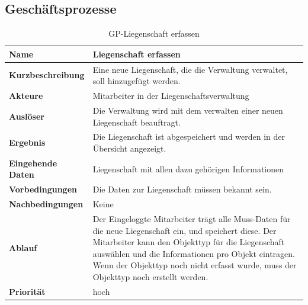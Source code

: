 \subsection{Geschäftsprozesse}
\begin{table}[H]
  \centering
  \settowidth{}
  \setlength\extrarowheight{2pt}
  \begin{tabulary}{1.0\textwidth}{|a|m{12cm}|}
    \hline
    \textbf{Name}&Liegenschaft erfassen\\
    \hline 
    \textbf{Kurzbeschreibung} & Eine neue Liegenschaft, die die Verwaltung verwaltet, soll hinzugefügt werden. \\
    \hline
    \textbf{Akteure} & Mitarbeiter in der Liegenschaftsverwaltung\\
    \hline
    \textbf{Auslöser} & Die Verwaltung wird mit dem verwalten einer neuen Liegenschaft beauftragt.\\
    \hline
    \textbf{Ergebnis} & Die Liegenschaft ist abgespeichert und werden in der Übersicht angezeigt.\\
    \hline
    \textbf{Eingehende Daten} & Liegenschaft mit allen dazu gehörigen Informationen\\
    \hline
    \textbf{Vorbedingungen} & Die Daten zur Liegenschaft müssen bekannt sein.\\
    \hline
    \textbf{Nachbedingungen} & Keine\\
    \hline
    \textbf{Ablauf} & Der Eingeloggte Mitarbeiter trägt alle Muss-Daten für die neue Liegenschaft ein, und speichert diese. Der Mitarbeiter kann den Objekttyp für die Liegenschaft auswählen und die Informationen pro Objekt eintragen. Wenn der Objekttyp noch nicht erfasst wurde, muss der Objekttyp noch erstellt werden.\\
    \hline
    \textbf{Priorität} & hoch\\
    \hline
  \end{tabulary}
  \caption{GP-Liegenschaft erfassen}
\end{table}

